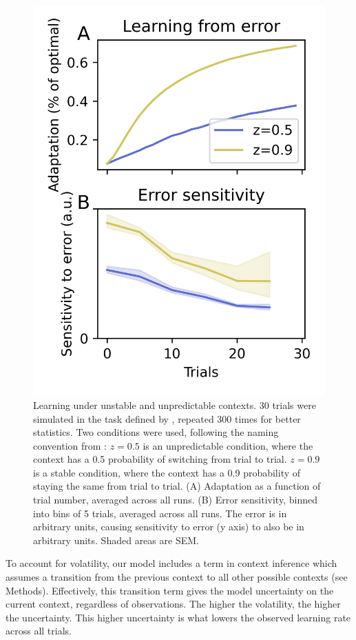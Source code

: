 \documentclass[a4paper,doc,floatsintext,natbib]{apa6}
\begin{document}
\begin{figure}
\centering
\includegraphics{./figures/figure_2.png}
\caption{Learning under unstable and unpredictable contexts. 30 trials were simulated in the task defined by \cite{Herzfeld_memory_2014}, repeated 300 times for better statistics. Two conditions were used, following the naming convention from \cite{Herzfeld_memory_2014}: $z=0.5$ is an unpredictable condition, where the context has a 0.5 probability of switching from trial to trial. $z=0.9$ is a stable condition, where the context has a 0.9 probability of staying the same from trial to trial. (A) Adaptation as a function of trial number, averaged across all runs. (B) Error sensitivity, binned into bins of 5 trials, averaged across all runs. The error is in arbitrary units, causing sensitivity to error (y axis) to also be in arbitrary units. Shaded areas are SEM.}
\label{fig:herzfeld-2014}
\end{figure}

To account for volatility, our model includes a term in context inference which assumes a transition from the previous context to all other possible contexts (see Methods). Effectively, this transition term gives the model uncertainty on the current context, regardless of observations. The higher the volatility, the higher the uncertainty. This higher uncertainty is what lowers the observed learning rate across all trials.
\end{document}
